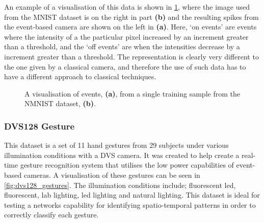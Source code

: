 An example of a visualisation of this data is shown in \cref{fig:nmnist_spikes_visualisation}, where the image used from the MNIST dataset is on the right in part \textbf{(b)} and the resulting spikes from the event-based camera are shown on the left in \textbf{(a)}. Here, `on events' are events where the intensity of a the particular pixel increased by an increment greater than a threshold, and the `off events' are when the intensities decrease by a increment greater than a threshold. The representation is clearly very different to the one given by a classical camera, and therefore the use of such data has to have a different approach to classical techniques.

\begin{figure}[htb]%
      \centering
      \qquad
      \caption{A visualisation of events, \textbf{(a)}, from a single training sample from the NMNIST dataset, \textbf{(b)}.}%
      \label{fig:nmnist_spikes_visualisation}%
\end{figure}

\subsubsection{DVS128 Gesture} \label{sssec:dvs128_gesture}

This dataset is a set of 11 hand gestures from 29 subjects under various illumination conditions with a DVS camera. It was created to help create a real-time gesture recognition system that utilises the low power capabilities of event-based cameras\cite{DVS128}. A visualisation of these gestures can be seen in \cref{fig:dvs128_gestures}. The illumination conditions include; fluorescent led, fluorescent, lab lighting, led lighting and natural lighting. This dataset is ideal for testing a networks capability for identifying spatio-temporal patterns in order to correctly classify each gesture.

